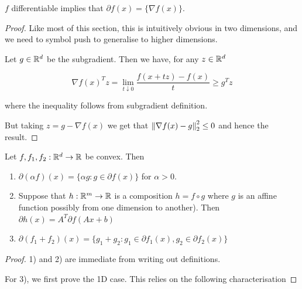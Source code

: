 \documentclass[11pt]{scrartcl}
\begin{document}
\begin{theorem}
$f$ differentiable implies that $\partial f(x) = \{ \nabla f(x) \}$.

\begin{proof}
Like most of this section, this is intuitively obvious in two dimensions, and we need to symbol push to generalise to higher dimensions.

Let $g \in \mathbb R^d$ be the subgradient. Then we have, for any $z \in \mathbb R^d$

\begin{equation}
    \nabla f(x)^T z = \lim_{t \downarrow 0} \frac{ f(x+tz)-f(x) }{ t } \ge g^T z
\end{equation}

where the inequality follows from subgradient definition.

But taking $z = g - \nabla f(x)$ we get that $\left\lVert\nabla f(x) - g\right\rVert_2^2 \le 0$ and hence the result.
\end{proof}
\end{theorem}

\begin{theorem}
\label{subgrad calc}
Let $f,f_1,f_2 : \mathbb R^d \rightarrow \mathbb R$ be convex. Then
\begin{enumerate}
    \item $\partial(\alpha f)(x) = \{ \alpha g : g \in \partial f(x) \}$ for $\alpha>0$.
    \item Suppose that $h:\mathbb R^m \rightarrow \mathbb R$ is a composition $h = f \circ g$ where $g$ is an affine function possibly from one dimension to another). Then $\partial h(x) = A^T \partial f(Ax+b) $
    \item $\partial(f_1 + f_2)(x) = \{ g_1 + g_2 : g_1 \in \partial f_1(x), g_2 \in \partial f_2(x) \}$
\end{enumerate}
\begin{proof}
1) and 2) are immediate from writing out definitions.

For 3), we first prove the 1D case. This relies on the following characterisation
\end{proof}
\end{theorem}
\end{document}
